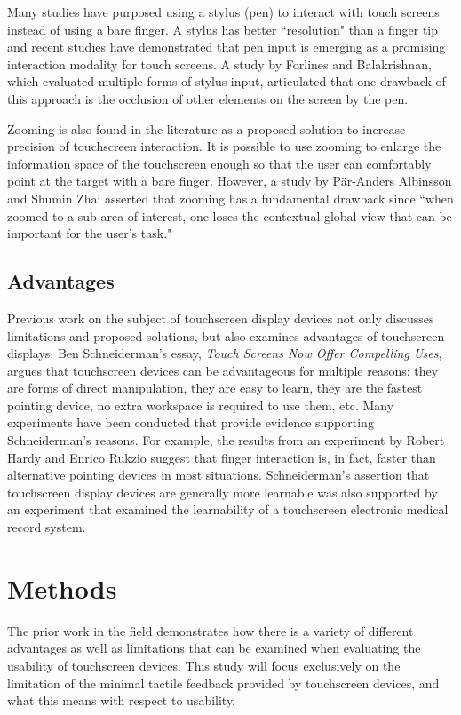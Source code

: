 \documentclass{article}
\begin{document}
Many studies have purposed using a stylus (pen) to interact with touch screens instead of using a bare finger. A stylus has better ``resolution" than a finger tip and recent studies have demonstrated that pen input is emerging as a promising interaction modality for touch screens.\cite{Bi} A study by Forlines and Balakrishnan, which evaluated multiple forms of stylus input, articulated that one drawback of this approach is the occlusion of other elements on the screen by the pen.\cite{Forlines}

Zooming is also found in the literature as a proposed solution to increase precision of touchscreen interaction. It is possible to use zooming to enlarge the information space of the touchscreen enough so that the user can comfortably point at the target with a bare finger. However, a study by P\"{a}r-Anders Albinsson and Shumin Zhai asserted that zooming has a fundamental drawback since ``when zoomed to a sub area of interest, one loses the contextual global view that can be important for the user's task."\cite{Albinsson} 

\subsection{Advantages}
Previous work on the subject of touchscreen display devices not only discusses limitations and proposed solutions, but also examines advantages of touchscreen displays. Ben Schneiderman's essay, \textit{Touch Screens Now Offer Compelling Uses},  argues that touchscreen devices can be advantageous for multiple reasons: they are forms of direct manipulation, they are easy to learn, they are the fastest pointing device, no extra workspace is required to use them, etc. \cite{73754} Many experiments have been conducted that provide evidence supporting Schneiderman's reasons. For example, the results from an experiment by Robert Hardy and Enrico Rukzio suggest that finger interaction is, in fact, faster than alternative pointing devices in most situations.\cite{Hardy:2008:TIT:1409240.1409267} Schneiderman's assertion that touchscreen display devices are generally more learnable was also supported by an experiment that examined the learnability of a touchscreen electronic medical record system.\cite{Douglas:2011:SUL:2029976.2029990}


\section{Methods}
The prior work in the field demonstrates how there is a variety of different advantages as well as limitations that can be examined when evaluating the usability of touchscreen devices. This study will focus exclusively on the limitation of the minimal tactile feedback provided by touchscreen devices, and what this means with respect to usability. 
\end{document}
